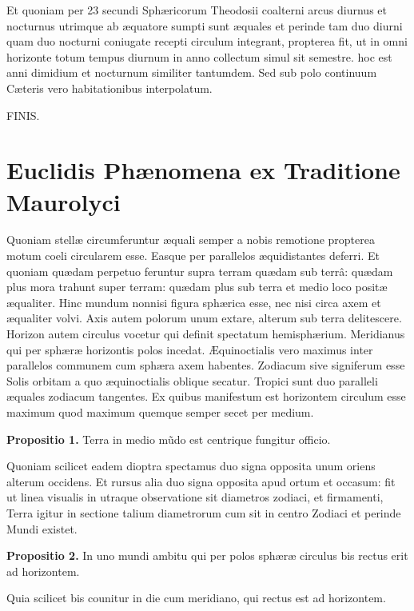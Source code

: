 \documentclass[11pt,a4paper]{article}
\begin{document}
Et quoniam per 23 secundi Sphæricorum Theodosii coalterni arcus diurnus et nocturnus utrimque ab æquatore sumpti sunt æquales et perinde tam duo diurni quam duo nocturni coniugate recepti circulum integrant, propterea fit, ut in omni horizonte totum tempus diurnum in anno collectum simul sit semestre. hoc est anni dimidium et nocturnum similiter tantumdem. Sed sub polo continuum Cæteris vero habitationibus interpolatum.

FINIS.

\section*{Euclidis Phænomena ex Traditione Maurolyci}

Quoniam stellæ circumferuntur æquali semper a nobis remotione propterea motum coeli circularem esse. Easque per parallelos æquidistantes deferri. Et quoniam quædam perpetuo feruntur supra terram quædam sub terrâ: quædam plus mora trahunt super terram: quædam plus sub terra et medio loco positæ æqualiter. Hinc mundum nonnisi figura sphærica esse, nec nisi circa axem et æqualiter volvi. Axis autem polorum unum extare, alterum sub terra delitescere. Horizon autem circulus vocetur qui definit spectatum hemisphærium. Meridianus qui per sphæræ horizontis polos incedat. Æquinoctialis vero maximus inter parallelos communem cum sphæra axem habentes. Zodiacum sive signiferum esse Solis orbitam a quo æquinoctialis oblique secatur. Tropici sunt duo paralleli æquales zodiacum tangentes. Ex quibus manifestum est horizontem circulum esse maximum quod maximum quemque semper secet per medium.

\textbf{Propositio 1.} Terra in medio mũdo est centrique fungitur officio.

Quoniam scilicet eadem dioptra spectamus duo signa opposita unum oriens alterum occidens. Et rursus alia duo signa opposita apud ortum et occasum: fit ut linea visualis in utraque observatione sit diametros zodiaci, et firmamenti, Terra igitur in sectione talium diametrorum cum sit in centro Zodiaci et perinde Mundi existet.

\textbf{Propositio 2.} In uno mundi ambitu qui per polos sphæræ circulus bis rectus erit ad horizontem.

Quia scilicet bis counitur in die cum meridiano, qui rectus est ad horizontem.
\end{document}
